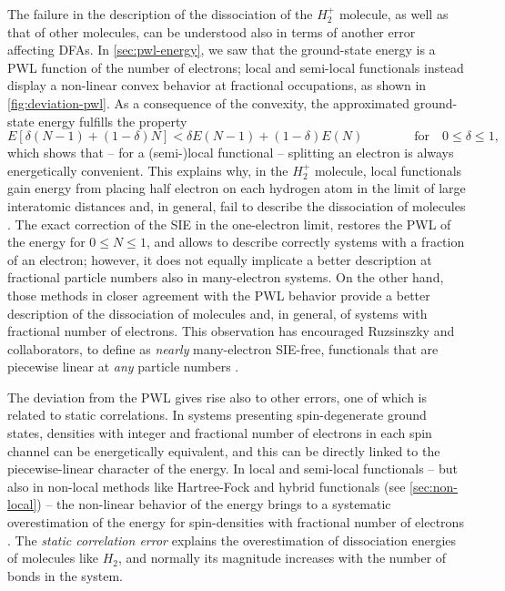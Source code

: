 The failure in the description of the dissociation of the $H_2^+$ molecule, as well as that of other molecules, can be understood also in terms of another error affecting DFAs. In \cref{sec:pwl-energy}, we saw that the ground-state energy is a PWL function of the number of electrons; local and semi-local functionals instead display a non-linear convex behavior at fractional occupations, as shown in \cref{fig:deviation-pwl}. As a consequence of the convexity, the approximated ground-state energy fulfills the property
%
\begin{equation}
    E \left[ \delta(N-1) + (1-\delta)N \right] < \delta E(N-1) + (1-\delta) E(N) \qquad \qquad
    \text{for} \quad 0 \leq \delta \leq 1 ,
    \label{eq:convexity}
\end{equation}
%
which shows that -- for a (semi-)local functional -- splitting an electron is always energetically convenient. This explains why, in the $H_2^+$ molecule, local functionals gain energy from placing half electron on each hydrogen atom in the limit of large interatomic distances and, in general, fail to describe the dissociation of molecules \cite{vydrov_tests_2007}. The exact correction of the SIE in the one-electron limit, restores the PWL of the energy for $0 \leq N \leq 1$, and allows to describe correctly systems with a fraction of an electron; however, it does not equally implicate a better description at fractional particle numbers also in many-electron systems. On the other hand, those methods in closer agreement with the PWL behavior provide a better description of the dissociation of molecules and, in general, of systems with fractional number of electrons. This observation has encouraged Ruzsinszky and collaborators, to define as \emph{nearly} many-electron SIE-free, functionals that are piecewise linear at \emph{any} particle numbers \cite{ruzsinszky_spurious_2006}.

The deviation from the PWL gives rise also to other errors, one of which is related to static correlations. In systems presenting spin-degenerate ground states, densities with integer and fractional number of electrons in each spin channel can be energetically equivalent, and this can be directly linked to the piecewise-linear character of the energy. In local and semi-local functionals -- but also in non-local methods like Hartree-Fock and hybrid functionals (see \cref{sec:non-local}) -- the non-linear behavior of the energy brings to a systematic overestimation of the energy for spin-densities with fractional number of electrons \cite{cohen_fractional-spins_2008, cohen_insights_2008}. The \emph{static correlation error} explains the overestimation of dissociation energies of molecules like $H_2$, and normally its magnitude increases with the number of bonds in the system.

